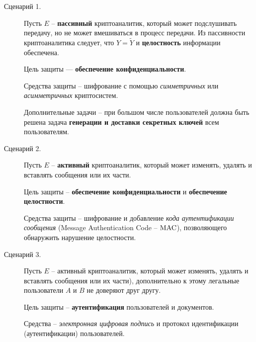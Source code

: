 \begin{description}
    \item[Сценарий 1.] Пусть $E$ -- \textbf{пассивный} криптоаналитик, который может подслушивать передачу, но не может вмешиваться в процесс передачи. Из пассивности криптоаналитика следует,  что $Y = \widetilde{Y}$ и \textbf{целостность} информации обеспечена.

Цель защиты --- \textbf{обеспечение конфиденциальности}.

Средства защиты -- шифрование с помощью \emph{симметричных} или \emph{асимметричных } криптосистем.

Дополнительные задачи -- при большом числе пользователей должна быть решена задача \textbf{генерации и доставки секретных ключей} всем пользователям.

    \item[Сценарий 2.] Пусть $E$ -- \textbf{активный} криптоаналитик, который может изменять, удалять и вставлять сообщения или их части.

    Цель защиты -- \textbf{обеспечение конфиденциальности} и  \textbf{обеспечение целостности}.

Средства защиты --  шифрование и добавление \emph{кода аутентификации сообщения} (Message Authentication Code -- $\textrm{MAC}$), позволяющего обнаружить нарушение целостности.

    \item[Сценарий 3.] Пусть $E$ -- активный криптоаналитик, который может изменять, удалять и вставлять сообщения или их части), дополнительно к этому легальные пользователи $A$ и $B$ не доверяют друг  другу.

Цель защиты -- \textbf{аутентификация }пользователей и документов.

Средства -- \emph{электронная  цифровая подпись} и протокол идентификации (аутентификации) пользователей.
\end{description}

%
